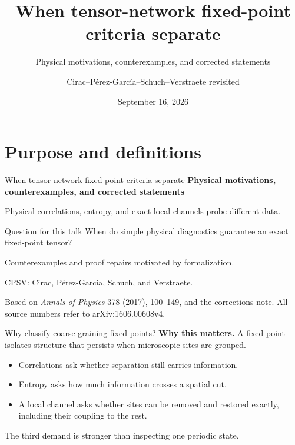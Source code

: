 \documentclass[aspectratio=169,14pt]{beamer}
\title{When tensor-network fixed-point criteria separate}
\subtitle{Physical motivations, counterexamples, and corrected statements}
\author{Cirac--P\'erez-Garc\'ia--Schuch--Verstraete revisited}
\date{September 16, 2026}
\newcommand{\why}[1]{\textcolor{amber}{\textbf{Why this matters.}} #1\par\medskip}
\begin{document}
\section{Purpose and definitions}
\begin{frame}{When tensor-network fixed-point criteria separate}
\textbf{Physical motivations, counterexamples, and corrected statements}\par\medskip
Physical correlations, entropy, and exact local channels probe different data.
\begin{block}{Question for this talk}
When do simple physical diagnostics guarantee an exact fixed-point tensor?
\end{block}
Counterexamples and proof repairs motivated by formalization.\par
CPSV: Cirac, P\'erez-Garc\'ia, Schuch, and Verstraete.\par
Based on \emph{Annals of Physics} 378 (2017), 100--149, and the corrections note. All source numbers refer to arXiv:1606.00608v4. \cite{Cirac2017Annals}
\end{frame}
\begin{frame}{Why classify coarse-graining fixed points?}
\why{A fixed point isolates structure that persists when microscopic sites are grouped.}
\begin{center}
\end{center}
\begin{itemize}
\item Correlations ask whether separation still carries information.
\item Entropy asks how much information crosses a spatial cut.
\item A local channel asks whether sites can be removed and restored exactly, including their coupling to the rest.
\end{itemize}
\alert{The third demand is stronger than inspecting one periodic state.}
\end{frame}
\end{document}
